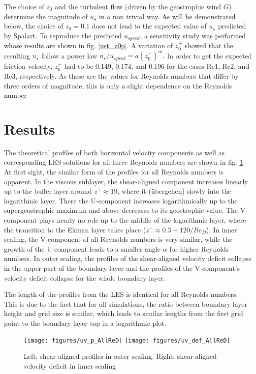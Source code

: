 \documentclass[a4paper,11pt]{article}
\begin{document}
The choice of $z_0$ and the turbulent flow (driven by the geostrophic wind $G$) determine the magnitude of $u_\star$ in a non trivial way. As will be demonstrated below, the choice of $z_0=0.1$ does not lead to the expected value of $u_\star$ predicted by Spalart. To reproduce the predicted $u_{\star pred}$, a sensitivity study was performed whose results are shown in fig. \ref{ust_z0p}. A variation of $z_0^+$ showed that the resulting $u_\star$ follow a power law $u_\star/u_{\star pred} = a(z^+_0)^m.$ In order to get the expected friction velocity, $z_0^+$ had to be 0.149, 0.174, and 0.196 for the cases Re1, Re2, and Re3, respectively. As these are the values for Reynolds numbers that differ by three orders of magnitude, this is only a slight dependence on the Reynolds number

\section{Results}

The theoretical profiles of both horizontal velocity components as well as corresponding LES solutions for all three Reynolds numbers are shown in fig. \ref{profiles_allred}. At first sight, the similar form of the profiles for all Reynolds numbers is apparent. In the viscous sublayer, the shear-aligned component increases linearly up to the buffer layer around $z^+\approx19$, where it (übergehen) slowly into the logarithmic layer. There the U-component increases logarithmically up to the supergeostrophic maximum and above decreases to its geostrophic value. The V-component plays nearly no role up to the middle of the logarithmic layer, where the transition to the Ekman layer takes place ($z^-\approx0.3-120/Re_D$). In inner scaling, the V-component of all Reynolds numbers is very similar, while the growth of the U-component leads to a smaller angle $\alpha$ for higher Reynolds numbers. In outer scaling, the profiles  of the shear-aligned velocity deficit collapse in the upper part of the boundary layer and the profiles of the V-component's velocity deficit collapse for the whole boundary layer.

The length of the profiles from the LES is identical for all Reynolds numbers. This is due to the fact that for all simulations, the ratio between boundary layer height and grid size is similar, which leads to similar lengths from the first grid point to the boundary layer top in a logarithmic plot.

\begin{figure}
  \centerline{
	\texttt{[image: figures/uv\_p\_AllReD]}
	\texttt{[image: figures/uv\_def\_AllReD]}
}
  \caption{Left: shear-aligned profiles in outer scaling. Right: shear-aligned velocity deficit in inner scaling}
  \label{profiles_allred}
\end{figure}
\end{document}
